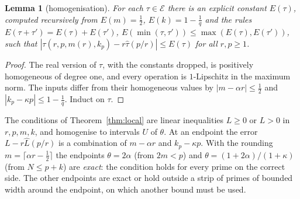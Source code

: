 \documentclass[11pt]{amsart}
\newtheorem{lemma}[theorem]{Lemma}
\theoremstyle{definition}
\theoremstyle{remark}
\numberwithin{equation}{section}
\begin{document}
\begin{lemma}[homogenisation]\label{lem:homog}
For each $\tau\in\mathcal E$ there is an explicit constant $E(\tau)$, computed recursively from
$E(m)=\frac12$, $E(k)=1-\frac1q$ and the rules $E(\tau+\tau')=E(\tau)+E(\tau')$, $E(\min(\tau,\tau'))\le\max(E(\tau),E(\tau'))$, such
that $|\tau(r,p,m(r),k_p)-r\hat\tau(p/r)|\le E(\tau)$ for all $r,p\ge1$.
\end{lemma}
\begin{proof}
The real version of $\tau$, with the constants dropped, is positively homogeneous of degree one, and every operation is
$1$-Lipschitz in the maximum norm. The inputs differ from their homogeneous values by $|m-\alpha r|\le\frac12$ and
$|k_p-\kappa p|\le1-\frac1q$. Induct on $\tau$.
\end{proof}

The conditions of Theorem~\ref{thm:local} are linear inequalities $L\ge0$ or $L>0$ in $r,p,m,k$, and homogenise to
intervals $U$ of $\theta$. At an endpoint the error $L-r\hat L(p/r)$ is a combination of $m-\alpha r$ and $k_p-\kappa p$.
With the rounding $m=\lceil\alpha r-\frac12\rceil$ the endpoints $\theta=2\alpha$ (from $2m<p$) and $\theta=(1+2\alpha)/(1+\kappa)$
(from $N\le p+k$) are \emph{exact}: the condition holds for every prime on the correct side. The other endpoints are exact
or hold outside a strip of primes of bounded width around the endpoint, on which another bound must be used.
\end{document}
